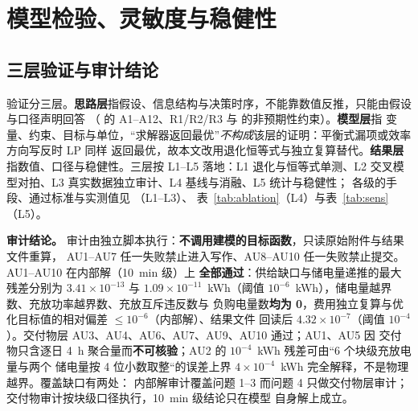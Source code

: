 
\section{模型检验、灵敏度与稳健性}\label{chap:verify}

\subsection{三层验证与审计结论}\label{sec:verify-three}\label{sec:audit}

验证分三层。\textbf{思路层}指假设、信息结构与决策时序，不能靠数值反推，只能由假设与口径声明回答
（ 的 A1--A12、R1/R2/R3 与  的非预期性约束）。\textbf{模型层}指
变量、约束、目标与单位，“求解器返回最优”\emph{不构成}该层的证明：平衡式漏项或效率方向写反时 LP 同样
返回最优，故本文改用退化恒等式与独立复算替代。\textbf{结果层}指数值、口径与稳健性。三层按 L1--L5
落地：L1 退化与恒等式单测、L2 交叉模型对拍、L3 真实数据独立审计、L4 基线与消融、L5 统计与稳健性；
各级的手段、通过标准与实测值见 （L1--L3）、
表~\ref{tab:ablation}（L4）与表~\ref{tab:sens}（L5）。

\textbf{审计结论。} 审计由独立脚本执行：\textbf{不调用建模的目标函数}，只读原始附件与结果文件重算，
AU1--AU7 任一失败禁止进入写作、AU8--AU10 任一失败禁止提交。AU1--AU10 在内部解（10~min 级）上
\textbf{全部通过}：供给缺口与储电量递推的最大残差分别为 \(3.41\times10^{-13}\) 与
\(1.09\times10^{-11}\)~kWh（阈值 \(10^{-6}\)~kWh），储电量越界数、充放功率越界数、充放互斥违反数与
负购电量数\textbf{均为 0}，费用独立复算与优化目标值的相对偏差 \(\le10^{-6}\)（内部解）、结果文件
回读后 \(4.32\times10^{-7}\)（阈值 \(10^{-4}\)）。交付物层 AU3、AU4、AU6、AU7、AU9、AU10 通过；AU1、AU5 因
交付物只含逐日 4~h 聚合量而\textbf{不可核验}；AU2 的 \(10^{-4}\)~kWh 残差可由“6 个块级充放电量与两个
储电量按 4 位小数取整“的误差上界 \(4\times10^{-4}\)~kWh 完全解释，不是物理越界。覆盖缺口有两处：
内部解审计覆盖问题 1--3 而问题 4 只做交付物层审计；交付物审计按块级口径执行，10~min 级结论只在模型
自身解上成立。

